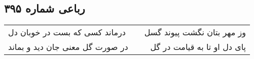 \begin{center}
\section*{رباعی شماره ۳۹۵}
\label{sec:sh395}
\begin{longtable}{l p{0.5cm} r}
درماند کسی که بست در خوبان دل
&&
وز مهر بتان نگشت پیوند گسل
\\
در صورت گل معنی جان دید و بماند
&&
پای دل او تا به قیامت در گل
\\
\end{longtable}
\end{center}
